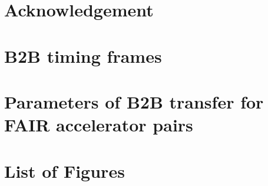 \documentclass[12pt,twoside]{report}
\begin{document}
\chapter{Acknowledgement}


%
\appendix
\chapter{B2B timing frames}

\chapter{Parameters of B2B transfer for FAIR accelerator pairs}

\chapter{List of Figures}



\end{document}
